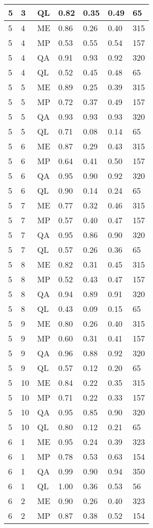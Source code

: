 \begin{table}[!ht]
\begin{tabularx}{300pt}{|X|X|X|X|X|X|X|}
\hline
5&3&QL&0.82&0.35&0.49&65\\
\hline
5&4&ME&0.86&0.26&0.40&315\\
\hline
5&4&MP&0.53&0.55&0.54&157\\
\hline
5&4&QA&0.91&0.93&0.92&320\\
\hline
5&4&QL&0.52&0.45&0.48&65\\
\hline
5&5&ME&0.89&0.25&0.39&315\\
\hline
5&5&MP&0.72&0.37&0.49&157\\
\hline
5&5&QA&0.93&0.93&0.93&320\\
\hline
5&5&QL&0.71&0.08&0.14&65\\
\hline
5&6&ME&0.87&0.29&0.43&315\\
\hline
5&6&MP&0.64&0.41&0.50&157\\
\hline
5&6&QA&0.95&0.90&0.92&320\\
\hline
5&6&QL&0.90&0.14&0.24&65\\
\hline
5&7&ME&0.77&0.32&0.46&315\\
\hline
5&7&MP&0.57&0.40&0.47&157\\
\hline
5&7&QA&0.95&0.86&0.90&320\\
\hline
5&7&QL&0.57&0.26&0.36&65\\
\hline
5&8&ME&0.82&0.31&0.45&315\\
\hline
5&8&MP&0.52&0.43&0.47&157\\
\hline
5&8&QA&0.94&0.89&0.91&320\\
\hline
5&8&QL&0.43&0.09&0.15&65\\
\hline
5&9&ME&0.80&0.26&0.40&315\\
\hline
5&9&MP&0.60&0.31&0.41&157\\
\hline
5&9&QA&0.96&0.88&0.92&320\\
\hline
5&9&QL&0.57&0.12&0.20&65\\
\hline
5&10&ME&0.84&0.22&0.35&315\\
\hline
5&10&MP&0.71&0.22&0.33&157\\
\hline
5&10&QA&0.95&0.85&0.90&320\\
\hline
5&10&QL&0.80&0.12&0.21&65\\
\hline
6&1&ME&0.95&0.24&0.39&323\\
\hline
6&1&MP&0.78&0.53&0.63&154\\
\hline
6&1&QA&0.99&0.90&0.94&350\\
\hline
6&1&QL&1.00&0.36&0.53&56\\
\hline
6&2&ME&0.90&0.26&0.40&323\\
\hline
6&2&MP&0.87&0.38&0.52&154\\

\end{tabularx}
\end{table}
